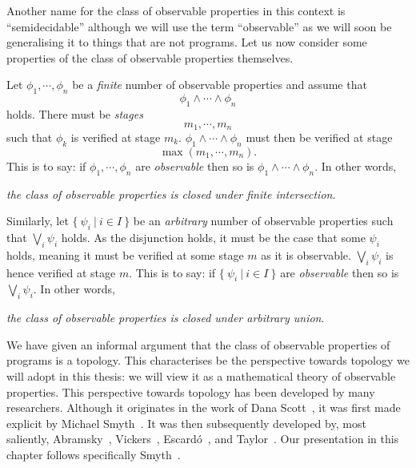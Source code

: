 Another name for the class of observable properties in this context is ``semidecidable''
although we will use the term ``observable'' as we will soon be generalising it to things
that are not programs. Let us now consider some properties of the class of observable
properties themselves.

Let $\phi_1, \cdots ,\phi_n$ be a \emph{finite} number of observable properties and assume that
\begin{equation*}
  \phi_1 \wedge \cdots \wedge \phi_n
\end{equation*}
holds. There must be \emph{stages}
\begin{equation*}
  m_1, \cdots , m_n
\end{equation*}
such that $\phi_k$ is verified at stage $m_k$. $\phi_1 \wedge \cdots \wedge \phi_n$ must then be verified at stage
\begin{equation*}
  \max(m_1, \cdots, m_n).
\end{equation*}
This is to say: if $\phi_1, \cdots, \phi_n$ are \emph{observable} then so is
$\phi_1 \wedge \cdots \wedge \phi_n$. In other words,
\begin{center}
  \emph{the class of observable properties is closed under finite intersection}.
\end{center}

Similarly, let $\{~\psi_i ~|~ i \in I~\}$ be an \emph{arbitrary} number of observable
properties such that $\bigvee_i \psi_i$ holds. As the disjunction holds, it must be the case that
some $\psi_i$ holds, meaning it must be verified at some stage $m$ as it is observable. $\bigvee_i
\psi_i$ is hence verified at stage $m$. This is to say: if $\{~\psi_i ~|~ i \in I~\}$ are
\emph{observable} then so is $\bigvee_i \psi_i$. In other words,
\begin{center}
  \emph{the class of observable properties is closed under arbitrary union}.
\end{center}

We have given an informal argument that the class of observable properties of programs is
a topology. This characterises be the perspective towards topology we will adopt in this
thesis: we will view it as a mathematical theory of observable properties. This
perspective towards topology has been developed by many researchers. Although it
originates in the work of Dana Scott~\cite{scott-original}, it was first made explicit by
Michael Smyth~\cite{smyth-handbook}. It was then subsequently developed by,
most saliently,
  Abramsky~\cite{abramsky-thesis},
  Vickers~\cite{vickers},
  Escardó~\cite{synthetic-topology}, and
  Taylor~\cite{taylor-asd}.
Our presentation in this chapter follows specifically Smyth~\cite{smyth-handbook}.

